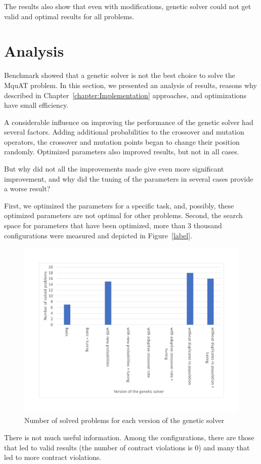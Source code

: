 The results also show that even with modifications, genetic solver could not get valid and optimal results for all problems.


\section{Analysis}
Benchmark showed that a genetic solver is not the best choice to solve the MquAT problem.
In this section, we presented an analysis of results, reasons why described in Chapter~\ref{chapter:Implementation} approaches, and optimizations have small efficiency.

A considerable influence on improving the performance of the genetic solver had several factors. Adding additional probabilities to the crossover and mutation operators, the crossover and mutation points began to change their position randomly.
Optimized parameters also improved results, but not in all cases.

But why did not all the improvements made give even more significant improvement, and why did the tuning of the parameters in several cases provide a worse result?

First, we optimized the parameters for a specific task, and, possibly, these optimized parameters are not optimal for other problems.
Second, the search space for parameters that have been optimized, more than 3 thousand configurations were measured and depicted in Figure~\ref{label}.
\begin{figure}
	\centering
	\includegraphics[width=\textwidth]{images/EvaluationNumberOfSolvedProblems.pdf}
	\caption[Number of problems for each version of the genetic solver]{Number of solved problems for each version of the genetic solver}
	\label{fig:EvaluationNumberOfSolvedProblems}
\end{figure}
There is not much useful information. Among the configurations, there are those that led to valid results (the number of contract violations is 0) and many that led to more contract violations.

